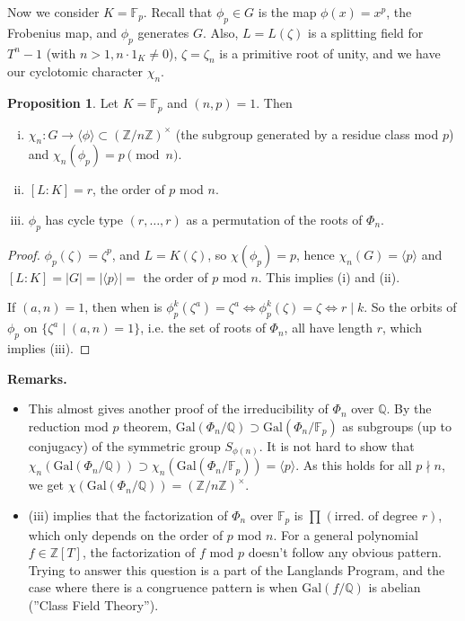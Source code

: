 \documentclass{article}
\theoremstyle{definition}
\newtheorem{prop}[theorem]{Proposition}
\begin{document}
Now we consider $K=\mathbb{F}_p$. Recall that $\phi_p \in G$ is the map $\phi(x)=x^p$, the Frobenius map, and $\phi_p$ generates $G$. Also, $L = L(\zeta)$ is a splitting field for $T^n-1$ (with $n>1, n\cdot 1_K \neq 0$), $\zeta = \zeta_n$ is a primitive root of unity, and we have our cyclotomic character $\chi_n$.
\begin{prop}
    Let $K=\mathbb{F}_p$ and $(n,p)=1$. Then
    \begin{enumerate}[(i)]
        \item $\chi_n : G \to \langle \phi \rangle \subset (\mathbb{Z}/n\mathbb{Z})^\times$ (the subgroup generated by a residue class mod $p$) and $\chi_n(\phi_p)=p \pmod{n}$.
        \item $[L:K]=r$, the order of $p$ mod $n$.
        \item $\phi_p$ has cycle type $(r,\ldots,r)$ as a permutation of the roots of $\Phi_n$.
    \end{enumerate}
\end{prop}
\begin{proof}
    $\phi_p(\zeta)=\zeta^p$, and $L=K(\zeta)$, so $\chi(\phi_p)=p$, hence $\chi_n(G)=\langle p \rangle$ and $[L:K] = |G| = |\langle p \rangle| =$ the order of $p$ mod $n$. This implies (i) and (ii).
    \vspace{1mm}
    
    If $(a,n)=1$, then when is $\phi_p^k(\zeta^a)=\zeta^a \iff \phi_p^k(\zeta)=\zeta \iff r \mid k$. So the orbits of $\phi_p$ on $\{\zeta^a \mid (a,n)=1\}$, i.e. the set of roots of $\Phi_n$, all have length $r$, which implies (iii). 
\end{proof} 
\textbf{Remarks.}
\begin{itemize}
    \item This almost gives another proof of the irreducibility of $\Phi_n$ over $\mathbb{Q}$. By the reduction mod $p$ theorem, $\text{Gal}(\Phi_n/\mathbb{Q}) \supset \text{Gal}(\Phi_n/\mathbb{F}_p)$ as subgroups (up to conjugacy) of the symmetric group $S_{\phi(n)}$. It is not hard to show that $\chi_n(\text{Gal}(\Phi_n/\mathbb{Q})) \supset \chi_n(\text{Gal}(\Phi_n/\mathbb{F}_p)) = \langle p \rangle$. As this holds for all $p \nmid n$, we get $\chi(\text{Gal}(\Phi_n/\mathbb{Q}))=(\mathbb{Z}/n\mathbb{Z})^\times$.
    \item (iii) implies that the factorization of $\Phi_n$ over $\mathbb{F}_p$ is $\prod_{}^{} (\text{irred. of degree }r)$, which only depends on the order of $p$ mod $n$. For a general polynomial $f \in \mathbb{Z}[T]$, the factorization of $f$ mod $p$ doesn't follow any obvious pattern. Trying to answer this question is a part of the Langlands Program, and the case where there is a congruence pattern is when $\text{Gal}(f/\mathbb{Q})$ is abelian (''Class Field Theory'').
\end{itemize}
\end{document}
